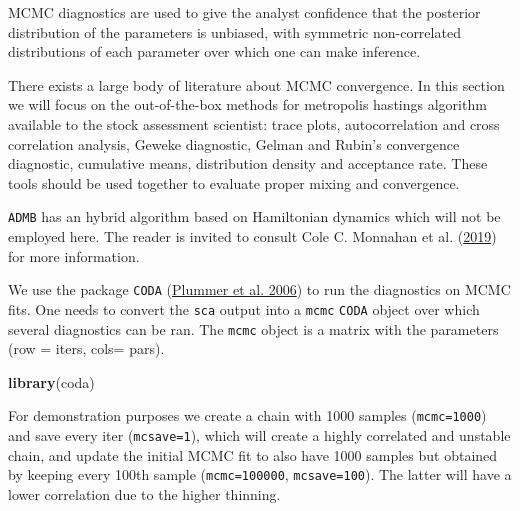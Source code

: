 \documentclass[
]{book}
\newenvironment{Shaded}{\begin{snugshade}}{\end{snugshade}}
\newcommand{\FunctionTok}[1]{\textcolor[rgb]{0.13,0.29,0.53}{\textbf{#1}}}
\newcommand{\NormalTok}[1]{#1}
\begin{document}
MCMC diagnostics are used to give the analyst confidence that the posterior distribution of the parameters is unbiased, with symmetric non-correlated distributions of each parameter over which one can make inference.

There exists a large body of literature about MCMC convergence. In this section we will focus on the out-of-the-box methods for metropolis hastings algorithm available to the stock assessment scientist: trace plots, autocorrelation and cross correlation analysis, Geweke diagnostic, Gelman and Rubin's convergence diagnostic, cumulative means, distribution density and acceptance rate. These tools should be used together to evaluate proper mixing and convergence.

\texttt{ADMB} has an hybrid algorithm based on Hamiltonian dynamics which will not be employed here. The reader is invited to consult Cole C. Monnahan et al. (\protect\hyperlink{ref-monnahan2019}{2019}) for more information.

We use the package \texttt{CODA} (\protect\hyperlink{ref-coda}{Plummer et al. 2006}) to run the diagnostics on MCMC fits. One needs to convert the \texttt{sca} output into a \texttt{mcmc} \texttt{CODA} object over which several diagnostics can be ran. The \texttt{mcmc} object is a matrix with the parameters (row = iters, cols= pars).

\begin{Shaded}
\begin{Highlighting}[]
\FunctionTok{library}\NormalTok{(coda)}
\end{Highlighting}
\end{Shaded}

For demonstration purposes we create a chain with 1000 samples (\texttt{mcmc=1000}) and save every iter (\texttt{mcsave=1}), which will create a highly correlated and unstable chain, and update the initial MCMC fit to also have 1000 samples but obtained by keeping every 100th sample (\texttt{mcmc=100000}, \texttt{mcsave=100}). The latter will have a lower correlation due to the higher thinning.
\end{document}
